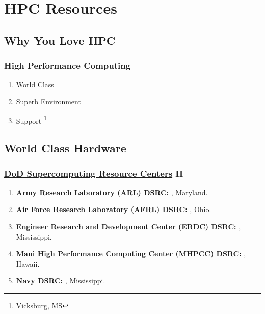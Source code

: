 % 

\section{HPC Resources}

\subsection{Why You Love HPC}

\begin{frame}\frametitle{High Performance Computing}
\begin{enumerate}
	\item World Class 
	\item Superb  Environment
	\item Support \footnote{Vicksburg, MS}
\end{enumerate}
\end{frame}

\subsection{World Class Hardware}

\begin{frame}\frametitle{\href{https://centers.hpc.mil/about/index.html}{DoD Supercomputing Resource Centers} II}
\begin{enumerate}
    \item \textbf{Army Research Laboratory (ARL) DSRC:} , Maryland.
    \item \textbf{Air Force Research Laboratory (AFRL) DSRC:} , Ohio.
    \item \textbf{Engineer Research and Development Center (ERDC) DSRC:} , Mississippi.
    \item \textbf{Maui High Performance Computing Center (MHPCC) DSRC:} , Hawaii.
    \item \textbf{Navy DSRC:} , Mississippi.
\end{enumerate}
\end{frame}

